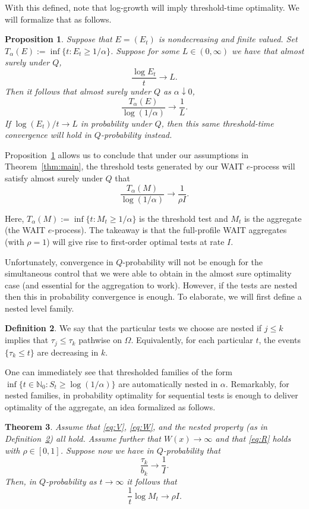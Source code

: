 \documentclass{article}
\newcommand{\NN}{\mathbb N}
\newtheorem{theorem}{Theorem}[section]
\newtheorem{proposition}[theorem]{Proposition}
\theoremstyle{definition}
\newtheorem{definition}[theorem]{Definition}
\begin{document}
With this defined, note that log-growth will imply threshold-time optimality. We will formalize that as follows.

\begin{proposition}\label{prop:log-growth-to-threshold}
Suppose that $E=(E_t)$ is nondecreasing and finite valued. Set $T_{\alpha}(E):=\inf\{t:E_t\ge 1/\alpha\}$. Suppose for some $L\in(0,\infty)$ we have that almost surely under $Q$,
\[
\frac{\log E_t}{t}\to L.
\]
Then it follows that almost surely under $Q$ as $\alpha\downarrow 0$,
\[
\frac{T_{\alpha}(E)}{\log(1/\alpha)}\to \frac1L.
\]
If $\log(E_t)/t\to L$ in probability under $Q$, then this same threshold-time convergence will hold in $Q$-probability instead.
\end{proposition}

Proposition~\ref{prop:log-growth-to-threshold} allows us to conclude that under our assumptions in Theorem~\ref{thm:main}, the threshold tests generated by our WAIT $e$-process will satisfy almost surely under $Q$ that
\[
\frac{T_{\alpha}(M)}{\log(1/\alpha)}\to \frac{1}{\rho I}.
\]

Here, $T_{\alpha}(M):=\inf\{t:M_t\ge 1/\alpha\}$ is the threshold test and $M_t$ is the aggregate (the WAIT $e$-process). The takeaway is that the full-profile WAIT aggregates (with $\rho=1$) will give rise to first-order optimal tests at rate $I$.

Unfortunately, convergence in $Q$-probability will not be enough for the simultaneous control that we were able to obtain in the almost sure optimality case (and essential for the aggregation to work). However, if the tests are nested then this in probability convergence is enough. To elaborate, we will first define a nested level family.

\begin{definition}\label{def:nested}
We say that the particular tests we choose are nested if $j\le k$ implies that $\tau_j\le\tau_k$ pathwise on $\Omega$. Equivalently, for each particular $t$, the events $\{\tau_k\le t\}$ are decreasing in $k$.    
\end{definition}

One can immediately see that thresholded families of the form $\inf\{t\in \NN_0: S_t\ge \log(1/\alpha)\}$ are automatically nested in $\alpha$. Remarkably, for nested families, in probability optimality for sequential tests is enough to deliver optimality of the aggregate, an idea formalized as follows.

\begin{theorem}\label{thm:nested-inprob}
Assume that \eqref{eq:V}, \eqref{eq:W}, and the nested property (as in Definition~\ref{def:nested}) all hold. Assume further that $W(x)\to\infty$ and that \eqref{eq:R} holds with $\rho\in[0,1]$. Suppose now we have in $Q$-probability that
\[
\frac{\tau_k}{b_k}\longrightarrow \frac{1}{I}.
\]
Then, in $Q$-probability as $t\to\infty$ it follows that
\[
\frac{1}{t}\log M_t\longrightarrow \rho I.
\]
\end{theorem}
\end{document}
